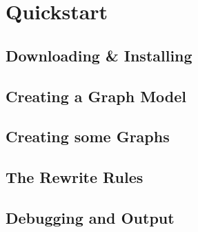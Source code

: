 \chapter{Quickstart}


\section{Downloading \& Installing}

\section{Creating a Graph Model}

\section{Creating some Graphs}

\section{The Rewrite Rules}

\section{Debugging and Output}
